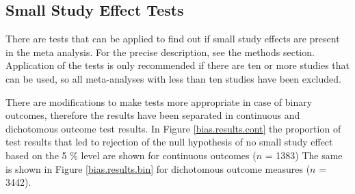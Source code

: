 \documentclass[11pt,a4paper,twoside]{book}\usepackage[]{graphicx}\usepackage[]{color}
\begin{document}
% 
% 



\subsection{Small Study Effect Tests}



There are tests that can be applied to find out if small study effects are present in the meta analysis. For the precise description, see the methods section. Application of the tests is only recommended if there are ten or more studies \citep{cochrane.handbook} that can be used, so all meta-analyses with less than ten studies have been excluded.

\vspace{0mm}
There are modifications to make tests more appropriate in case of binary outcomes, therefore the results have been separated in continuous and dichotomous outcome test results. In Figure \ref{bias.results.cont} the proportion of test results that led to rejection of the null hypothesis of no small study effect based on the 5 \% level are shown for continuous outcomes ($n$ = 1383)
The same is shown in Figure \ref{bias.results.bin} for dichotomous outcome measures ($n$ = 3442).
\end{document}
